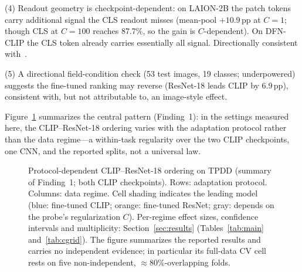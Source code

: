\documentclass[10pt,a4paper]{article}
\begin{document}
(4) Readout geometry is checkpoint-dependent: on LAION-2B the patch tokens carry additional signal the CLS readout misses (mean-pool $+10.9$\,pp at $C{=}1$; though CLS at $C{=}100$ reaches 87.7\%, so the gain is $C$-dependent). On DFN-CLIP the CLS token already carries essentially all signal. Directionally consistent with~\cite{shi2026registers}.

(5) A directional field-condition check (53 test images, 19 classes; underpowered) suggests the fine-tuned ranking may reverse (ResNet-18 leads CLIP by 6.9\,pp), consistent with, but not attributable to, an image-style effect.

Figure~\ref{fig:protocol} summarizes the central pattern (Finding~1): in the settings measured here, the CLIP--ResNet-18 ordering varies with the adaptation protocol rather than the data regime---a within-task regularity over the two CLIP checkpoints, one CNN, and the reported splits, not a universal law.

\begin{figure}[!ht]
\centering
{}
\caption{Protocol-dependent CLIP--ResNet-18 ordering on TPDD (summary of Finding~1; both CLIP checkpoints). Rows: adaptation protocol. Columns: data regime. Cell shading indicates the leading model (blue: fine-tuned CLIP; orange: fine-tuned ResNet; gray: depends on the probe's regularization $C$). Per-regime effect sizes, confidence intervals and multiplicity: Section~\ref{sec:results} (Tables~\ref{tab:main} and~\ref{tab:cgrid}). The figure summarizes the reported results and carries no independent evidence; in particular its full-data CV cell rests on five non-independent, ${\approx}80\%$-overlapping folds.}
\label{fig:protocol}
\end{figure}
\end{document}
